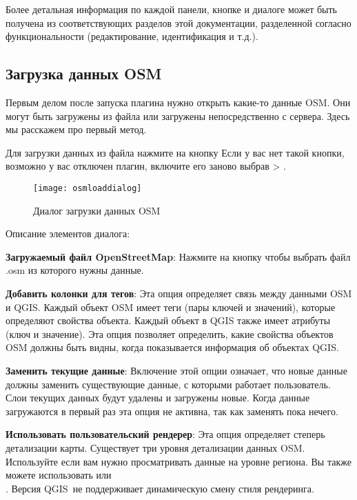 Более детальная информация по каждой панели, кнопке и диалоге может быть
получена из соответствующих разделов этой документации, разделенной
согласно функциональности (редактирование, идентификация и т.д.).

\subsection{Загрузка данных OSM}

Первым делом после запуска плагина нужно открыть какие-то данные OSM.
Они могут быть загружены из файла или загружены непосредственно с
сервера. Здесь мы расскажем про первый метод.

Для загрузки данных из файла нажмите на кнопку
 Если у вас нет такой
кнопки, возможно у вас отключен плагин, включите его заново выбрав
 \arrow {} >
.

\begin{figure}[ht]
   \centering
   \texttt{[image: osmloaddialog]}
   \caption{Диалог загрузки данных OSM \nixcaption}\label{fig:osmload}
\end{figure}

Описание элементов диалога:

\begin{description}
\item \textbf{Загружаемый файл OpenStreetMap}: Нажмите на кнопку чтобы
выбрать файл .osm из которого нужны данные.
\item \textbf{Добавить колонки для тегов}: Эта опция определяет связь
между данными OSM и QGIS. Каждый объект OSM имеет теги (пары ключей и
значений), которые определяют свойства объекта. Каждый объект в QGIS
также имеет атрибуты (ключ и значение). Эта опция позволяет определить,
какие свойства объектов OSM должны быть видны, когда показывается
информация об объектах QGIS.
\item \textbf{Заменить текущие данные}: Включение этой опции означает,
что новые данные должны заменить существующие данные, с которыми
работает пользователь. Слои текущих данных будут удалены и загружены
новые. Когда данные загружаются в первый раз эта опция не активна, так
как заменять пока нечего.
\item \textbf{Использовать пользовательский рендерер}: Эта опция
определяет степерь детализации карты. Существует три уровня детализации
данных OSM. Используйте  если вам нужно
просматривать данные на уровне региона. Вы также можете использовать
 или \\
. Версия QGIS~\CURRENT не поддерживает
динамическую смену стиля рендеринга.
\end{description}

